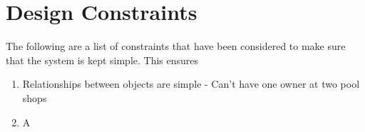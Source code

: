 \section{Design Constraints}

\par
The following are a list of constraints that have been considered to make sure that the system is kept simple. This ensures 

\begin{enumerate}
	\item Relationships between objects are simple - Can't have one owner at two pool shops
	\item A
\end{enumerate}
